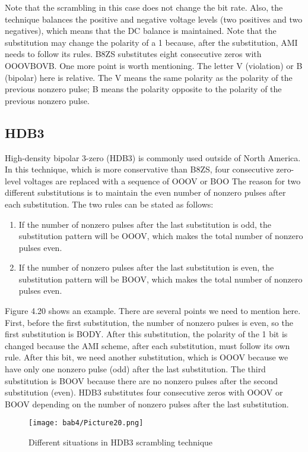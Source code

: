 Note that the scrambling in this case does not change the bit rate. Also, the technique balances the positive and negative voltage levels (two positives and two negatives), which means that the DC balance is maintained. Note that the substitution may change the polarity of a 1 because, after the substitution, AMI needs to follow its rules. B8ZS substitutes eight consecutive zeros with OOOVBOVB. One more point is worth mentioning. The letter V (violation) or B (bipolar) here is relative. The V means the same polarity as the polarity of the previous nonzero pulse; B means the polarity opposite to the polarity of the previous nonzero pulse.

\subsection*{HDB3}
High-density bipolar 3-zero (HDB3) is commonly used outside of North America. In this technique, which is more conservative than B8ZS, four consecutive zero-level voltages are replaced with a sequence of OOOV or BOO\: The reason for two different substitutions is to maintain the even number of nonzero pulses after each substitution. The two rules can be stated as follows:
\begin{enumerate}
  \item If the number of nonzero pulses after the last substitution is odd, the substitution pattern will be OOOV, which makes the total number of nonzero pulses even.
  \item If the number of nonzero pulses after the last substitution is even, the substitution pattern will be BOOV, which makes the total number of nonzero pulses even.
\end{enumerate}

Figure 4.20 shows an example. There are several points we need to mention here. First, before the first substitution, the number of nonzero pulses is even, so the first substitution is BODY. After this substitution, the polarity of the 1 bit is changed because the AMI scheme, after each substitution, must follow its own rule. After this bit, we need another substitution, which is OOOV because we have only one nonzero pulse (odd) after the last substitution. The third substitution is BOOV because there are no nonzero pulses after the second substitution (even). HDB3 substitutes four consecutive zeros with OOOV or BOOV depending on the number of nonzero pulses after the last substitution.

\begin{figure}
  \centering
  \texttt{[image: bab4/Picture20.png]}
  \caption{Different situations in HDB3 scrambling technique}
  \label{fig4:20}
\end{figure}


